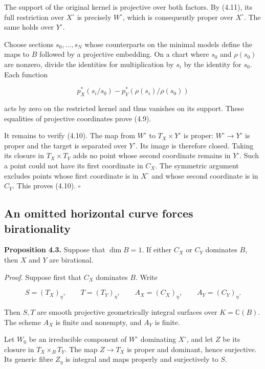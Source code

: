 \documentclass[11pt,a4paper]{article}
\begin{document}
The support of the original kernel is projective over both factors. By (4.11), its full restriction over $X^\circ$ is precisely $W^\circ$, which is consequently proper over $X^\circ$. The same holds over $Y^\circ$.

Choose sections $s_0,\ldots,s_N$ whose counterparts on the minimal models define the maps to $B$ followed by a projective embedding. On a chart where $s_0$ and $\rho(s_0)$ are nonzero, divide the identities for multiplication by $s_i$ by the identity for $s_0$. Each function

\begin{equation*}
p_X^*(s_i/s_0)-p_Y^*(\rho(s_i)/\rho(s_0))
\end{equation*}

acts by zero on the restricted kernel and thus vanishes on its support. These equalities of projective coordinates prove (4.9).

It remains to verify (4.10). The map from $W^\circ$ to $T_X\times Y^\circ$ is proper: $W^\circ\to Y^\circ$ is proper and the target is separated over $Y^\circ$. Its image is therefore closed. Taking its closure in $T_X\times T_Y$ adds no point whose second coordinate remains in $Y^\circ$. Such a point could not have its first coordinate in $C_X$. The symmetric argument excludes points whose first coordinate is in $X^\circ$ and whose second coordinate is in $C_Y$. This proves (4.10). $\square$

\subsection{An omitted horizontal curve forces birationality}

\noindent \textbf{Proposition 4.3.} Suppose that $\dim B=1$. If either $C_X$ or $C_Y$ dominates $B$, then $X$ and $Y$ are birational.

\noindent \emph{Proof.} Suppose first that $C_X$ dominates $B$. Write

\begin{equation*}
S=(T_X)_\eta,\qquad T=(T_Y)_\eta,
\qquad A_X=(C_X)_\eta,\qquad A_Y=(C_Y)_\eta.
\end{equation*}

Then $S,T$ are smooth projective geometrically integral surfaces over $K=\mathbb C(B)$. The scheme $A_X$ is finite and nonempty, and $A_Y$ is finite.

Let $W_0$ be an irreducible component of $W^\circ$ dominating $X^\circ$, and let $Z$ be its closure in $T_X\times_B T_Y$. The map $Z\to T_X$ is proper and dominant, hence surjective. Its generic fibre $Z_\eta$ is integral and maps properly and surjectively to $S$.
\end{document}
